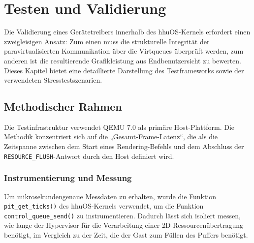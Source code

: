 \chapter{Testen und Validierung}

Die Validierung eines Gerätetreibers innerhalb des hhuOS-Kernels erfordert einen
zweigleisigen Ansatz: Zum einen muss die strukturelle Integrität der
paravirtualisierten Kommunikation über die Virtqueues überprüft werden, zum
anderen ist die resultierende Grafikleistung aus Endbenutzersicht zu bewerten.
Dieses Kapitel bietet eine detaillierte Darstellung des Testframeworks sowie der
verwendeten Stresstestszenarien.

\section{Methodischer Rahmen}

Die Testinfrastruktur verwendet QEMU 7.0 als primäre Host-Plattform. Die
Methodik konzentriert sich auf die „Gesamt-Frame-Latenz“, die als die
Zeitspanne zwischen dem Start eines Rendering-Befehls und dem Abschluss der
\texttt{RESOURCE\_FLUSH}-Antwort durch den Host definiert wird.

\subsection{Instrumentierung und Messung}

Um mikrosekundengenaue Messdaten zu erhalten, wurde die Funktion
\texttt{pit\_get\_ticks()} des hhuOS-Kernels verwendet, um die Funktion
\texttt{control\_queue\_send()} zu instrumentieren. Dadurch lässt sich isoliert
messen, wie lange der Hypervisor für die Verarbeitung einer
2D-Ressourcenübertragung benötigt, im Vergleich zu der Zeit, die der Gast zum
Füllen des Puffers benötigt.

\begin{center}
\end{center}

